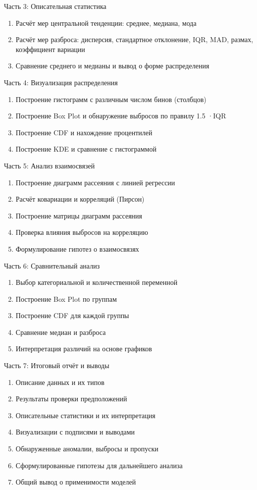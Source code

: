 Часть 3: Описательная статистика
\begin{enumerate}
    \item Расчёт мер центральной тенденции: среднее, медиана, мода
    \item Расчёт мер разброса: дисперсия, стандартное отклонение, IQR, MAD, размах, коэффициент вариации
    \item Сравнение среднего и медианы и вывод о форме распределения
\end{enumerate}

Часть 4: Визуализация распределения
\begin{enumerate}
    \item Построение гистограмм с различным числом бинов (столбцов)
    \item Построение Box Plot и обнаружение выбросов по правилу 1.5 ·IQR
    \item Построение CDF и нахождение процентилей
    \item Построение KDE и сравнение с гистограммой
\end{enumerate}


Часть 5: Анализ взаимосвязей
\begin{enumerate}
    \item Построение диаграмм рассеяния с линией регрессии
    \item Расчёт ковариации и корреляций (Пирсон)
    \item Построение матрицы диаграмм рассеяния
    \item Проверка влияния выбросов на корреляцию
    \item Формулирование гипотез о взаимосвязях
\end{enumerate}


Часть 6: Сравнительный анализ
\begin{enumerate}
    \item Выбор категориальной и количественной переменной
    \item Построение Box Plot по группам
    \item Построение CDF для каждой группы
    \item Сравнение медиан и разброса
    \item Интерпретация различий на основе графиков
\end{enumerate}


Часть 7: Итоговый отчёт и выводы
\begin{enumerate}
    \item Описание данных и их типов
    \item Результаты проверки предположений
    \item Описательные статистики и их интерпретация
    \item Визуализации с подписями и выводами
    \item Обнаруженные аномалии, выбросы и пропуски
    \item Сформулированные гипотезы для дальнейшего анализа
    \item Общий вывод о применимости моделей
\end{enumerate}

